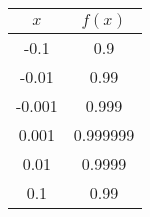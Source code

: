 \begin{tabular}{cc}
$x$ & $f(x)$ \\ \hline
-0.1 & 0.9 \\
 -0.01 & 0.99 \\
 -0.001 & 0.999 \\
 0.001 & 0.999999 \\
 0.01 & 0.9999 \\
 0.1 & 0.99
 \end{tabular}
